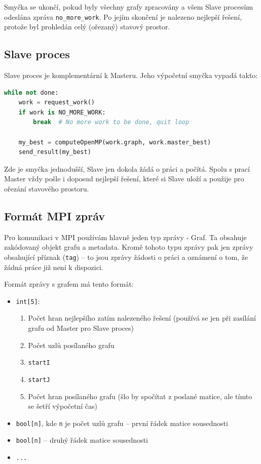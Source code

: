 \documentclass[czech]{article}
\begin{document}
Smyčka se ukončí, pokud byly všechny grafy zpracovány a všem Slave procesům odeslána zpráva \texttt{no\_more\_work}. Po jejím skončení je nalezeno nejlepší řešení, protože byl prohledán celý (ořezaný) stavový prostor.

\subsection{Slave proces}
Slave proces je komplementární k Masteru. Jeho výpočetní smyčka vypadá takto:
\begin{lstlisting}[tabsize=2,language=python]
while not done:
	work = request_work()
	if work is NO_MORE_WORK:
		break  # No more work to be done, quit loop
		
	my_best = computeOpenMP(work.graph, work.master_best)
	send_result(my_best)
\end{lstlisting}

Zde je smyčka jednodušší, Slave jen dokola žádá o práci a počítá. Spolu s prací Master vždy pošle i doposud nejlepší řešení, které si Slave uloží a použije pro ořezání stavového prostoru.

\subsection{Formát MPI zpráv}
Pro komunikaci v MPI používám hlavně jeden typ zprávy - Graf. Ta obsahuje zakódovaný objekt grafu a metadata. Kromě tohoto typu zprávy pak jen zprávy obsahující příznak (\texttt{tag}) -- to jsou zprávy žádosti o práci a oznámení o tom, že žádná práce již není k dispozici.

Formát zprávy s grafem má tento formát:
\begin{itemize}
	\item \texttt{int[5]}: \begin{enumerate}
		\item Počet hran nejlepšího zatím nalezeného řešení (používá se jen při zasílání grafu od Master pro Slave proces)
		\item Počet uzlů posílaného grafu
		\item \texttt{startI}
		\item \texttt{startJ}
		\item Počet hran posílaného grafu (šlo by spočítat z poslané matice, ale tímto se šetří výpočetní čas)
	\end{enumerate}

	\item \texttt{bool[n]}, kde \texttt{n} je počet uzlů grafu -- první řádek matice sousednosti 
	\item \texttt{bool[n]} -- druhý řádek matice sousednosti
	\item \texttt{...}
\end{itemize}
\end{document}
